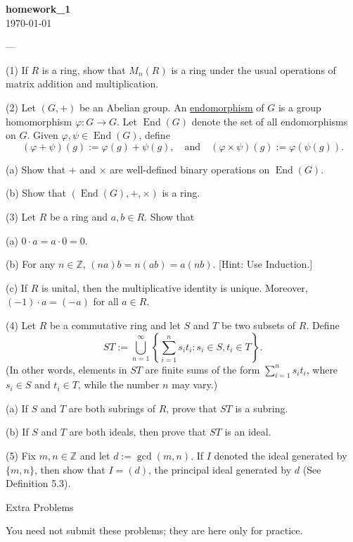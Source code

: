 \documentclass[11pt]{article}
\theoremstyle{definition}
\theoremstyle{remark}
\begin{document}
\begin{center}
{\Large\textbf{homework_1}}\\
\vspace{0.3cm}
{\normalsize\today}
\end{center}
\vspace{0.5cm}


---

(1) If $R$ is a ring, show that $M_n(R)$ is a ring under the usual operations of matrix addition and multiplication.

(2) Let $(G, +)$ be an Abelian group. An \underline{endomorphism} of $G$ is a group homomorphism $\varphi : G \to G$. Let $\operatorname{End}(G)$ denote the set of all endomorphisms on $G$. Given $\varphi, \psi \in \operatorname{End}(G)$, define
\[
(\varphi + \psi)(g) := \varphi(g) + \psi(g), \quad \text{and} \quad (\varphi \times \psi)(g) := \varphi(\psi(g)).
\]

(a) Show that $+$ and $\times$ are well-defined binary operations on $\operatorname{End}(G)$.

(b) Show that $(\operatorname{End}(G), +, \times)$ is a ring.

(3) Let $R$ be a ring and $a, b \in R$. Show that

(a) $0 \cdot a = a \cdot 0 = 0$.

(b) For any $n \in \mathbb{Z}$, $(na)b = n(ab) = a(nb)$. [Hint: Use Induction.]

(c) If $R$ is unital, then the multiplicative identity is unique. Moreover, $(-1) \cdot a = (-a)$ for all $a \in R$.

(4) Let $R$ be a commutative ring and let $S$ and $T$ be two subsets of $R$. Define
\[
ST := \bigcup_{n=1}^{\infty} \left\{ \sum_{i=1}^n s_i t_i : s_i \in S, t_i \in T \right\}.
\]
(In other words, elements in $ST$ are finite sums of the form $\sum_{i=1}^n s_i t_i$, where $s_i \in S$ and $t_i \in T$, while the number $n$ may vary.)

(a) If $S$ and $T$ are both subrings of $R$, prove that $ST$ is a subring.

(b) If $S$ and $T$ are both ideals, then prove that $ST$ is an ideal.

(5) Fix $m, n \in \mathbb{Z}$ and let $d := \gcd(m, n)$. If $I$ denoted the ideal generated by $\{m, n\}$, then show that $I = (d)$, the principal ideal generated by $d$ (See Definition 5.3).

Extra Problems

You need not submit these problems; they are here only for practice.
\end{document}
